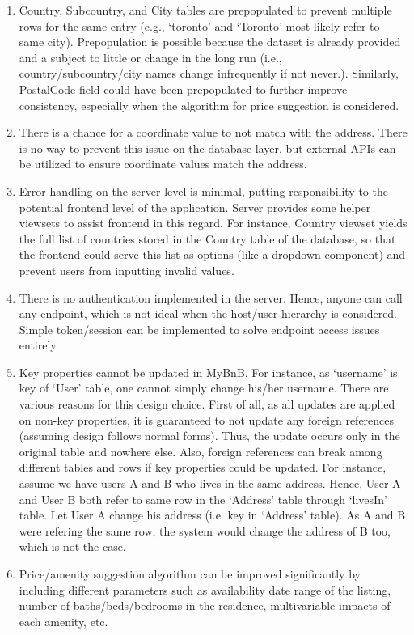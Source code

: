 \documentclass[11pt]{article}
\begin{document}
\begin{enumerate}
  \item Country, Subcountry, and City tables are prepopulated to prevent multiple rows
  for the same entry (e.g., `toronto' and `Toronto' most likely refer to same city).
  Prepopulation is possible because the dataset is already provided and a subject to
  little or change in the long run (i.e., country/subcountry/city names change infrequently
  if not never.). Similarly, PostalCode field could have been prepopulated to further
  improve consistency, especially when the algorithm for price suggestion is considered.

  \item There is a chance for a coordinate value to not match with the address. There is no
  way to prevent this issue on the database layer, but external APIs can be utilized to ensure
  coordinate values match the address.

  \item Error handling on the server level is minimal, putting responsibility to the
  potential frontend level of the application. Server provides some helper viewsets
  to assist frontend in this regard. For instance, Country viewset yields the full list
  of countries stored in the Country table of the database, so that the frontend could
  serve this list as options (like a dropdown component) and prevent users from inputting
  invalid values.

  \item There is no authentication implemented in the server. Hence, anyone can call any
  endpoint, which is not ideal when the host/user hierarchy is considered. Simple token/session
  can be implemented to solve endpoint access issues entirely.

  \item Key properties cannot be updated in MyBnB. For instance, as `username' is key
  of `User' table, one cannot simply change his/her username. There are various reasons for this
  design choice. First of all, as all updates are applied on non-key properties, it is guaranteed
  to not update any foreign references (assuming design follows normal forms). Thus, the update
  occurs only in the original table and nowhere else. Also, foreign references can break among
  different tables and rows if key properties could be updated. For instance, assume we have users
  A and B who lives in the same address. Hence, User A and User B both refer to same row in the
  `Address' table through `livesIn' table. Let User A change his address (i.e. key in `Address' table).
  As A and B were refering the same row, the system would change the address of B too, which
  is not the case.

  \item Price/amenity suggestion algorithm can be improved significantly by including different parameters
  such as availability date range of the listing, number of baths/beds/bedrooms in the residence,
  multivariable impacts of each amenity, etc.
\end{enumerate}
\end{document}
